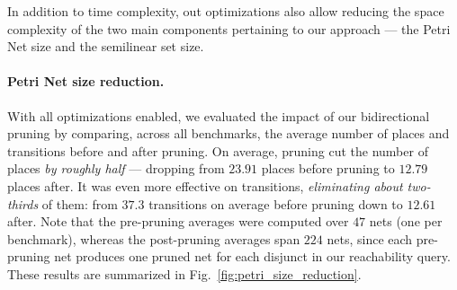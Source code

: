 In addition to time complexity, out optimizations also allow reducing the space complexity of the two main components pertaining to our approach --- the Petri Net size and the semilinear set size.

\paragraph{Petri Net size reduction.}

With all optimizations enabled, we evaluated the impact of our bidirectional pruning by comparing, across all benchmarks, the average number of places and transitions before and after pruning. On average, pruning cut the number of places \textit{by roughly half} --- dropping from $23.91$ places before pruning to $12.79$ places after. It was even more effective on transitions, \textit{eliminating about two-thirds} of them: from $37.3$ transitions on average before pruning down to $12.61$ after. Note that the pre-pruning averages were computed over $47$ nets (one per benchmark), whereas the post-pruning averages span $224$ nets, since each pre-pruning net produces one pruned net for each disjunct in our reachability query. These results are summarized in Fig.~\ref{fig:petri_size_reduction}.









